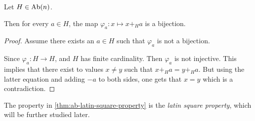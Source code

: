 \begin{theorem} \label{thm:ab-latin-square-property}
    Let \( H \in \operatorname{Ab}(n) \).

    Then for every \( a \in H \), the map \( \varphi_a: x \mapsto x +_H a \) is a bijection.
\end{theorem}
\begin{proof}
    Assume there exists an \( a \in H \) such that \( \varphi_a \) is not a bijection.
    
    Since \( \varphi_a: H \to H \), and \( H \) has finite cardinality. Then \( \varphi_a \) is not injective. This implies that there exist to values \( x \neq y \) such that \( x +_H a = y +_H a \). But using the latter equation and adding \( -a \) to both sides, one gets that \( x = y \) which is a contradiction.
\end{proof}

\begin{remark}
    The property in \autoref{thm:ab-latin-square-property} is the \emph{latin square property}, which will be further studied later.
\end{remark}


